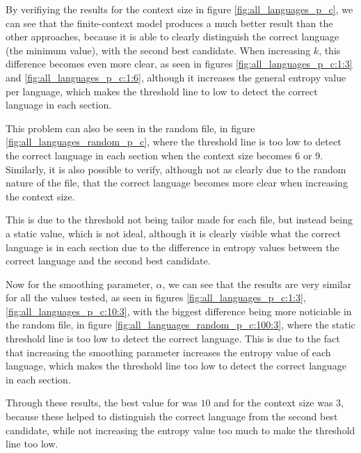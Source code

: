\documentclass{article}
\begin{document}
By verifiying the results for the context size in figure \ref{fig:all_languages_p_c}, we can see that the finite-context model produces a much better result than the other approaches,
because it is able to clearly distinguish the correct language (the minimum value), with the second best candidate.
When increasing $k$, this difference becomes even more clear, as seen in figures \ref{fig:all_languages_p_c:1:3} and \ref{fig:all_languages_p_c:1:6},
although it increases the general entropy value per language, which makes the threshold line to low to detect the correct language in each section.

This problem can also be seen in the random file, in figure \ref{fig:all_languages_random_p_c}, where the threshold line is too low to detect the correct language in each section when the context size
becomes $6$ or $9$.
Similarly, it is also possible to verify, although not as clearly due to the random nature of the file, that the correct language becomes more clear when increasing the context size.

This is due to the threshold not being tailor made for each file, but instead being a static value, which is not ideal, although it is clearly visible what the correct language is
in each section due to the difference in entropy values between the correct language and the second best candidate.

Now for the smoothing parameter, $\alpha$, we can see that the results are very similar for all the values tested, as seen in figures \ref{fig:all_languages_p_c:1:3}, \ref{fig:all_languages_p_c:10:3},
with the biggest difference being more noticiable in the random file, in figure \ref{fig:all_languages_random_p_c:100:3}, where the static threshold line is too low to detect the correct language.
This is due to the fact that increasing the smoothing parameter increases the entropy value of each language, which makes the threshold line too low to detect the correct language in each section.

Through these results, the best value for \alpha was $10$ and for the context size was $3$, because these helped to distinguish the correct language from the second best candidate, while not increasing the entropy value too much to make the threshold line too low.
\end{document}
